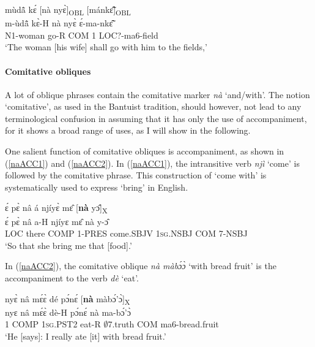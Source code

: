 \begin{exe} 
\ex\label{Lobj2}
  \glll mùdã̂ kɛ́ [nà nyɛ̀]\textsubscript{OBL} [mánkɛ̃̂]\textsubscript{OBL} \\
       m-ùdã̂ kɛ̀-H nà nyɛ̀ ɛ́-ma-nkɛ̃̂ \\
         N1-woman go-R COM 1 LOC?-ma6-field  \\
    \trans `The woman [his wife] shall go with him to the fields,'
\end{exe}




\paragraph{Comitative obliques}

A lot of oblique phrases contain the comitative marker {\itshape nà} `and/with'. The notion `comitative', as used in the Bantuist tradition, should however, not lead to any terminological confusion in assuming that it has only the use of accompaniment, for it shows a broad range of uses, as I will show in the following.

One salient function of comitative obliques is accompaniment, as shown in (\ref{naACC1}) and (\ref{naACC2}). In (\ref{naACC1}), the intransitive verb {\itshape njì} `come' is followed by the comitative phrase. This construction of `come with' is systematically used to express `bring' in English.

\begin{exe} 
\ex\label{naACC1} 
  \glll   ɛ́ pɛ̀ nâ á njíyɛ̀ mɛ̂ [{\bfseries nà} yɔ̂]\textsubscript{X} \\
         ɛ́ pɛ̀ nâ a-H njíyɛ mɛ̂ nà y-ɔ̂ \\
         LOC there COMP 1-PRES come.SBJV 1\textsc{sg}.NSBJ COM 7-NSBJ  \\
    \trans `So that she bring me that [food].'
\end{exe}

\noindent In (\ref{naACC2}), the comitative oblique {\itshape nà màbɔ́ɔ̀} `with bread fruit' is the accompaniment to the verb {\itshape dè} `eat'.

\begin{exe} 
\ex\label{naACC2}
  \glll nyɛ̀ nâ mɛ́ɛ̀ dé pɔ́nɛ́ [{\bfseries nà} màbɔ́'ɔ̀]\textsubscript{X} \\
        nyɛ nâ mɛ́ɛ̀ dè-H pɔ́nɛ́ nà ma-bɔ́'ɔ̀ \\
      1 COMP 1\textsc{sg}.PST2 eat-R $\emptyset$7.truth COM ma6-bread.fruit   \\
    \trans `He [says]: I really ate [it] with bread fruit.'
\end{exe}

